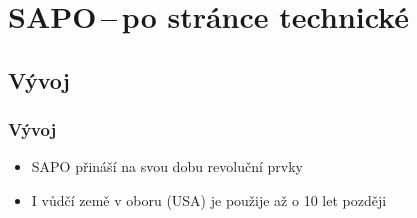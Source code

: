 \documentclass{beamer}
\begin{document}
\section{SAPO\,--\,po stránce technické}
\subsection{Vývoj}
    \begin{frame}
        \frametitle{Vývoj}
        \begin{itemize}
            \item SAPO přináší na svou dobu revoluční prvky
            \item I vůdčí země v oboru (USA) je použije až o 10 let později
        \end{itemize}
        \begin{center}
        \end{center}
    \end{frame}
\end{document}
